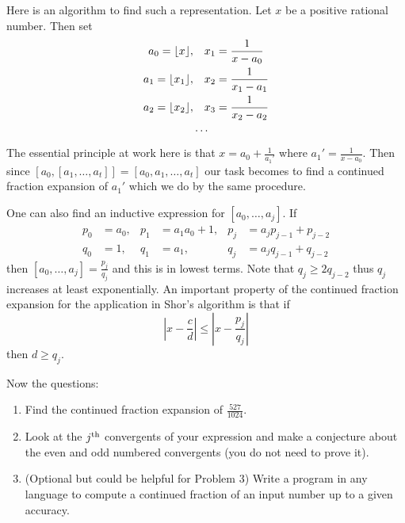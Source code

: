 Here is an algorithm to find such a representation.  Let $x$ be a positive rational number.  Then set 
\begin{align*}
a_0 = \lfloor x \rfloor, &\quad x_1 = \frac{1}{x-a_0} \\
a_1 = \lfloor x_1 \rfloor, &\quad x_2 = \frac{1}{x_1-a_1} \\
a_2 = \lfloor x_2 \rfloor, &\quad x_3 = \frac{1}{x_2-a_2} \\
&\cdots
\end{align*}
The essential principle at work here is that $x = a_0 + \frac{1}{a_1'}$ where $a_1' = \frac{1}{x-a_0}$.  Then 
since $[a_0, [a_1, \ldots, a_t]] = [a_0, a_1, \ldots, a_t]$ our task becomes to find a continued fraction expansion 
of $a_1'$ which we do by the same procedure.  

One can also find an inductive expression for $[a_0, \ldots, a_j]$.  If 
\begin{align*}
p_0 &= a_0, & p_1 &= a_1 a_0 + 1, & p_j &= a_j p_{j-1} + p_{j-2} \\
q_0 &= 1,  & q_1 &= a_1, & q_j &= a_j q_{j-1} + q_{j-2}
\end{align*}  
then $[a_0, \ldots, a_j] = \frac{p_j}{q_j}$ and this is in lowest terms.  Note that $q_j \ge 2 q_{j-2}$ thus $q_j$ increases 
at least exponentially.  An important property of the continued fraction expansion for the application in Shor's algorithm 
is that if 
\[
|x - \frac{c}{d}| \le |x - \frac{p_j}{q_j}|
\]
then $d \ge q_j$.  

Now the questions:
\begin{enumerate}
\item Find the continued fraction expansion of $\frac{527}{1024}$.  
\item Look at the $j^{\scriptsize \mbox{{\rm th}}}$ convergents of your expression and 
make a conjecture about the even and odd numbered convergents (you do not need to prove it).
\item (Optional but could be helpful for Problem 3) Write a program in any language to compute 
a continued fraction of an input number up to a given accuracy.
\end{enumerate}

